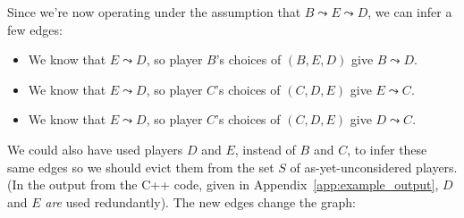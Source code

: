 \documentclass[12pt,x11names, rgb]{article}
\begin{document}
    Since we're now operating under the assumption that $B \leadsto E \leadsto D$, we can infer a few edges:
    \begin{itemize}
        \item We know that $E \leadsto D$, so player $B$'s choices of $(B,E,D)$ give $B\leadsto D$.
        \item We know that $E \leadsto D$, so player $C$'s choices of $(C,D,E)$ give $E\leadsto C$.
        \item We know that $E \leadsto D$, so player $C$'s choices of $(C,D,E)$ give $D\leadsto C$.
    \end{itemize}
    We could also have used players $D$ and $E$, instead of $B$ and $C$, to infer these same edges so we should evict them from the set $S$ of as-yet-unconsidered players. (In the output from the C++ code, given in Appendix~\ref{app:example_output}, $D$ and $E$ \emph{are} used redundantly). The new edges change the graph:
\end{document}
